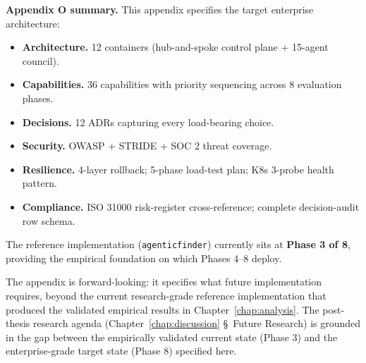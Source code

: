 \noindent\textbf{Appendix O summary.} This appendix specifies the target enterprise architecture:
\begin{itemize}[leftmargin=*, itemsep=2pt]
    \item \textbf{Architecture.} 12 containers (hub-and-spoke control plane + 15-agent council).
    \item \textbf{Capabilities.} 36 capabilities with priority sequencing across 8 evaluation phases.
    \item \textbf{Decisions.} 12 ADRs capturing every load-bearing choice.
    \item \textbf{Security.} OWASP + STRIDE + SOC 2 threat coverage.
    \item \textbf{Resilience.} 4-layer rollback; 5-phase load-test plan; K8s 3-probe health pattern.
    \item \textbf{Compliance.} ISO 31000 risk-register cross-reference; complete decision-audit row schema.
\end{itemize}
\noindent The reference implementation (\texttt{agenticfinder}) currently sits at \textbf{Phase 3 of 8}, providing the empirical foundation on which Phases 4--8 deploy.

\noindent The appendix is forward-looking: it specifies what future implementation requires, beyond the current research-grade reference implementation that produced the validated empirical results in Chapter~\ref{chap:analysis}. The post-thesis research agenda (Chapter~\ref{chap:discussion} \S~Future Research) is grounded in the gap between the empirically validated current state (Phase 3) and the enterprise-grade target state (Phase 8) specified here.
